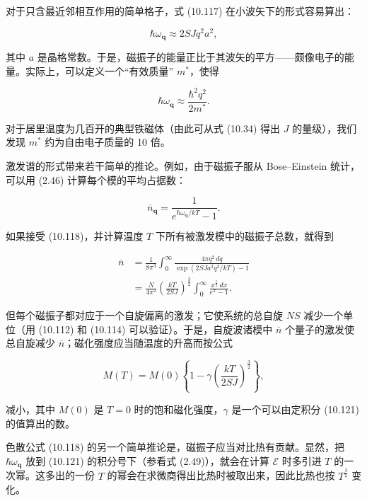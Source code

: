 对于只含最近邻相互作用的简单格子，式 (10.117) 在小波矢下的形式容易算出：

\begin{equation*}
\hbar\omega_{\mathbf{q}} \approx 2SJq^2a^2,
\tag{10.118}
\end{equation*}

其中 $a$ 是晶格常数。于是，磁振子的能量正比于其波矢的平方——颇像电子的能量。实际上，可以定义一个“有效质量” $m^{*}$，使得

\begin{equation*}
\hbar\omega_{\mathbf{q}} \approx \frac{\hbar^2 q^2}{2m^{*}}.
\tag{10.119}
\end{equation*}

对于居里温度为几百开的典型铁磁体（由此可从式 (10.34) 得出 $J$ 的量级），我们发现 $m^{*}$ 约为自由电子质量的 10 倍。

激发谱的形式带来若干简单的推论。例如，由于磁振子服从 Bose--Einstein 统计，可以用 (2.46) 计算每个模的平均占据数：

\begin{equation*}
\overline{n}_{\mathbf{q}} = \frac{1}{e^{\hbar\omega_{\mathbf{q}}/kT}-1}.
\tag{10.120}
\end{equation*}

如果接受 (10.118)，并计算温度 $T$ 下所有被激发模中的磁振子总数，就得到

\begin{align*}
\overline{n} &= \frac{1}{8\pi^3}\int_0^{\infty}\frac{4\pi q^2\,dq}{\exp(2SJa^2q^2/kT)-1}\\
&= \frac{N}{4\pi^2}\left(\frac{kT}{2SJ}\right)^{\frac{3}{2}}\int_0^{\infty}\frac{x^{\frac{1}{2}}\,dx}{e^x-1}.
\tag{10.121}
\end{align*}

但每个磁振子都对应于一个自旋偏离的激发；它使系统的总自旋 $NS$ 减少一个单位（用 (10.112) 和 (10.114) 可以验证）。于是，自旋波诸模中 $\overline{n}$ 个量子的激发使总自旋减少 $\overline{n}$；磁化强度应当随温度的升高而按公式

\begin{equation*}
M(T) = M(0)\left\{1-\gamma\left(\frac{kT}{2SJ}\right)^{\frac{3}{2}}\right\},
\tag{10.122}
\end{equation*}

减小，其中 $M(0)$ 是 $T=0$ 时的饱和磁化强度，$\gamma$ 是一个可以由定积分 (10.121) 的值算出的数。

色散公式 (10.118) 的另一个简单推论是，磁振子应当对比热有贡献。显然，把 $\hbar\omega_{\mathbf{q}}$ 放到 (10.121) 的积分号下（参看式 (2.49)），就会在计算 $\mathcal{E}$ 时多引进 $T$ 的一次幂。这多出的一份 $T$ 的幂会在求微商得出比热时被取出来，因此比热也按 $T^{\frac{3}{2}}$ 变化。

